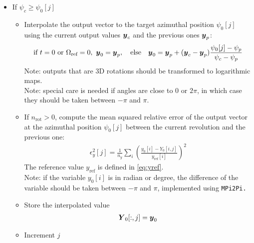 \documentclass[11pt]{article}
\begin{document}
\begin{itemize}
\begin{itemize}
            \item If $\psi_c \geq \psi_0[j]$
                \begin{itemize}
                    \item Interpolate the output vector to the target azimuthal position $\psi_0[j]$ using the current output values $\boldsymbol{y}_c$ and the previous ones $\boldsymbol{y}_p$:
                        \begin{align}
                            \text{if $t=0$ or $\Omega_\text{ref}=0$} , \ 
                            \v{y}_0 = \v{y}_p,
                            \quad \text{else}\quad 
                            \v{y}_0 = \v{y}_p + (\v{y}_c-\v{y}_p)\frac{\psi_0[j]-\psi_p}{\psi_c-\psi_p}   %
                        \end{align}
                        Note: outputs that are 3D rotations should be transformed to logarithmic maps.\\
                        Note: special care is needed if angles are close to 0 or $2\pi$, in which case they should be taken between $-\pi$ and $\pi$.
                    \item If $n_\text{rot}>0$, compute the mean squared relative error of the output vector at the azimuthal position $\psi_0[j]$ between the current revolution and the previous one:
                        \begin{align}
                            \epsilon_y^2[j] %
                            = \frac{1}{n_y} \sum_i \left(\frac{y_0[i]-Y_0[i,j]}{y_\text{ref}[i]}  \right)^2
                        \end{align}
                        The reference value $y_\text{ref}$ is defined in \autoref{eq:yref}.\\
                        Note: if the variable $y_0[i]$ is in radian or degree, the difference of the variable should be taken between $-\pi$ and $\pi$, implemented using \tt{MPi2Pi}. \\
                    \item Store the interpolated value
                        \begin{align}
                            \boldsymbol{Y}_0[:,j] = \boldsymbol{y}_0
                        \end{align}
                    \item Increment $j$%
                \end{itemize}


\end{itemize}
\end{itemize}
\end{document}
